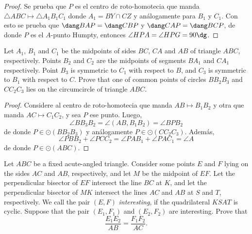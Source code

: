 \begin{proof}
	Se prueba que $P$ es el centro de roto-homotecia que manda $\triangle ABC\mapsto\triangle A_1B_1C_1$ donde $A_1=BY\cap CZ$ y análogamente para $B_1$ y $C_1$. Con esto se prueba que $\dang BAP=\dang CBP$ y $\dang CAP=\dang BCP$, de donde $P$ es el $A$-punto Humpty, entonces $\angle HPA=\angle HPG=90\dg$.
\end{proof}

\begin{probEG}
	Let $A_1$, $B_1$ and $C_1$ be the midpoints of sides $BC$, $CA$ and $AB$ of triangle $ABC$, respectively. Points $B_2$ and $C_2$ are the midpoints of segments $BA_1$ and $CA_1$ respectively. Point $B_3$ is symmetric to $C_1$ with respect to $B$, and $C_3$ is symmetric to $B_1$ with respect to $C$.
Prove that one of common points of circles $BB_2B_3$ and $CC_2C_3$ lies on the circumcircle of triangle $ABC$.
\end{probEG}

\begin{proof}
	Considere al centro de roto-homotecia que manda $AB\mapsto B_1B_2$ y otra que manda $AC\mapsto C_1C_2$, y sea $P$ ese punto. Luego,
	\[\angle BB_3B_2=\angle(AB,B_1B_2)=\angle BPB_2\]
	de donde $P\in\odot(BB_2B_3)$ y análogamente $P\in\odot(CC_2C_3)$. Además,
	\[\angle PBB_2+\angle PCC_2=\angle PAB_1+\angle PAC_1=\angle A\]
	de donde $P\in\odot(ABC)$.
\end{proof}


\begin{problem}[ISL 2014/G6]
	Let $ABC$ be a fixed acute-angled triangle. Consider some points $E$ and $F$ lying on the sides $AC$ and $AB$, respectively, and let $M$ be the midpoint of $EF$. Let the perpendicular bisector of $EF$ intersect the line $BC$ at $K$, and let the perpendicular bisector of $MK$ intersect the lines $AC$ and $AB$ at $S$ and $T$, respectively. We call the pair $(E,F)$ \emph{interesting}, if the quadrilateral $KSAT$ is cyclic. Suppose that the pair $(E_1,F_1)$ and $(E_2,F_2)$ are interesting. Prove that
	\[\frac{E_1E_2}{AB}=\frac{F_1F_2}{AC}.\]
\end{problem}

